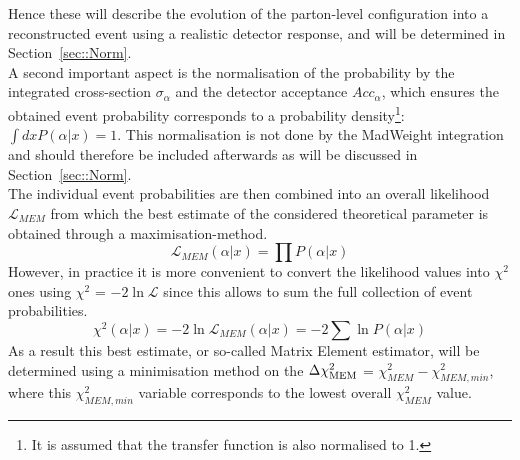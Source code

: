 Hence these will describe the evolution of the parton-level configuration into a reconstructed event using a realistic detector response, and will be determined in Section~\ref{sec::Norm}.
\\
A second important aspect is the normalisation of the probability by the integrated cross-section $\sigma_{\alpha}$ and the detector acceptance $Acc_{\alpha}$, which ensures the obtained event probability corresponds to a probability density\footnote{It is assumed that the transfer function is also normalised to 1.}: $\int dx P(\alpha \vert x) = 1$.
This normalisation is not done by the MadWeight integration and should therefore be included afterwards as will be discussed in Section~\ref{sec::Norm}. %
\\

The individual event probabilities are then combined into an overall likelihood $\mathcal{L}_{MEM}$ from which the best estimate of the considered theoretical parameter is obtained through a maximisation-method.
\begin{equation} \label{eq::Likelihood}
 \mathcal{L}_{MEM}(\alpha \vert x) = \prod P(\alpha \vert x)
\end{equation}
However, in practice it is more convenient to convert the likelihood values into $\chi^{2}$ ones using $\chi^{2}$ = $-2 \ln \mathcal{L}$ since this allows to sum the full collection of event probabilities.
\begin{equation} \label{eq::DeltaChi}
 \chi^{2}(\alpha \vert x) = -2 \ln \mathcal{L}_{MEM}(\alpha \vert x) = -2 \sum \ln P(\alpha \vert x)
\end{equation}
As a result this best estimate, or so-called Matrix Element estimator, will be determined using a minimisation method on the $\Delta \chi^{2}_{\textrm{MEM}}$ = $\chi^{2}_{MEM} - \chi^{2}_{MEM,min}$, where this $\chi^{2}_{MEM,min}$ variable corresponds to the lowest overall $\chi^{2}_{MEM}$ value.

